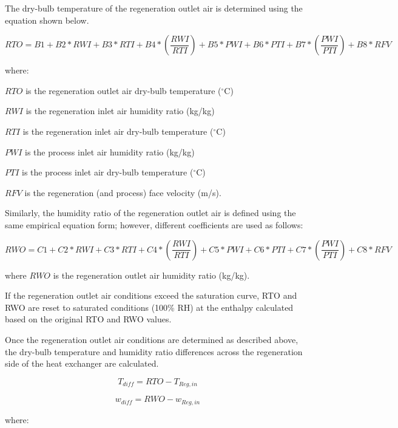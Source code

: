 The dry-bulb temperature of the regeneration outlet air is determined using the equation shown below.

\begin{equation}
RTO = B1 + B2*RWI + B3*RTI + B4*\left( {\frac{{RWI}}{{RTI}}} \right) + B5*PWI + B6*PTI + B7*\left( {\frac{{PWI}}{{PTI}}} \right) + B8*RFV
\end{equation}

where:

\(RTO\) is the regeneration outlet air dry-bulb temperature (\(^{\circ}\)C)

\(RWI\) is the regeneration inlet air humidity ratio (kg/kg)

\(RTI\) is the regeneration inlet air dry-bulb temperature (\(^{\circ}\)C)

\(PWI\) is the process inlet air humidity ratio (kg/kg)

\(PTI\) is the process inlet air dry-bulb temperature (\(^{\circ}\)C)

\(RFV\) is the regeneration (and process) face velocity (m/s).

Similarly, the humidity ratio of the regeneration outlet air is defined using the same empirical equation form; however, different coefficients are used as follows:

\begin{equation}
RWO = C1 + C2*RWI + C3*RTI + C4*\left( {\frac{{RWI}}{{RTI}}} \right) + C5*PWI + C6*PTI + C7*\left( {\frac{{PWI}}{{PTI}}} \right) + C8*RFV
\end{equation}

where \(RWO\) is the regeneration outlet air humidity ratio (kg/kg).

If the regeneration outlet air conditions exceed the saturation curve, RTO and RWO are reset to saturated conditions (100\% RH) at the enthalpy calculated based on the original RTO and RWO values.

Once the regeneration outlet air conditions are determined as described above, the dry-bulb temperature and humidity ratio differences across the regeneration side of the heat exchanger are calculated.

\begin{equation}
{T_{diff}} = RTO - {T_{Reg,in}}
\end{equation}

\begin{equation}
{w_{diff}} = RWO - {w_{Reg,in}}
\end{equation}

where:

